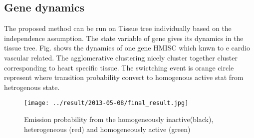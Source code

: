 \documentclass{article}
\begin{document}
\subsection{Gene dynamics}

The proposed method can be run on Tissue tree individually based on the independence assumption.
The state variable of gene gives its dynamics in the tissue tree. Fig. shows the dynamics
of one gene HMISC which knwn to e cardio vascular related. The agglomerative clustering nicely 
cluster together cluster corresponding to heart specific tissue. The swictching event is 
orange circle represent where transition probability convert to homogenous active stat from
hetrogenous state.

\begin{figure}[h]
	\begin{center}
		\texttt{[image: ../result/2013-05-08/final\_result.jpg]}
	\end{center}
	\caption{Emission probability from the homogeneously inactive(black), heterogeneous (red) and homogeneously active (green)}
	\label{fig:dynamics}
\end{figure}


\end{document}
